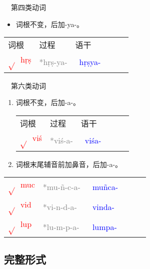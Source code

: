 \documentclass[17pt]{beamer}
\newcommand{\skt}[1]{{\sanskritfont{#1}}} %
\newcommand{\verbroot}[1]{\textcolor{red}{$\sqrt{}$#1}}
\newcommand{\sktroot}[1]{{\verbroot{\skt{#1}}}}
\newcommand{\skttransroot}[1]{{\sktroot{#1}~\textcolor{red}{#1}}}
\newcommand{\verbstem}[1]{\textcolor{blue}{#1\nobreakdash-}}
\newcommand{\sktverbstem}[1]{{\textcolor{blue}{\skt{#1\nobreakdash-}}}}
\newcommand{\skttransverbstem}[1]{{\sktverbstem{#1}~\verbstem{#1}}}
\begin{document}
\begin{frame}{\insertsubsection ~~第四类动词}
  \small
  \begin{itemize}
    \item
      词根不变，后加\nobreakdash-ya\nobreakdash-。
  \end{itemize} 

  \centering
  \begin{tabular}{@{}llllll@{}} %
    词根 & 过程 & 语干  \\
    \skttransroot{hṛṣ} & \textcolor{gray}{*hṛṣ-ya-} & \skttransverbstem{hṛṣya}  \\
  \end{tabular}

\end{frame}

\begin{frame}{\insertsubsection ~~第六类动词}
  \small
  \begin{enumerate}
    \item
      词根不变，后加\nobreakdash-a\nobreakdash-。

      \begin{tabular}{@{}llllll@{}} %
        词根 & 过程 & 语干  \\
        \skttransroot{viś} & \textcolor{gray}{*viś-a-} & \skttransverbstem{viśa}  \\
      \end{tabular}
   
    \item
      词根末尾辅音前加鼻音，后加\nobreakdash-a\nobreakdash-。
  \end{enumerate} 

  \centering
  \begin{tabular}{@{}llllll@{}} %
    \skttransroot{muc} & \textcolor{gray}{*mu-ñ-c-a-} & \skttransverbstem{muñca}  \\
    \skttransroot{vid} & \textcolor{gray}{*vi-n-d-a-} & \skttransverbstem{vinda}  \\
    \skttransroot{lup} & \textcolor{gray}{*lu-m-p-a-} & \skttransverbstem{lumpa}  \\
  \end{tabular}

\end{frame}

\subsection{完整形式}
\end{document}
